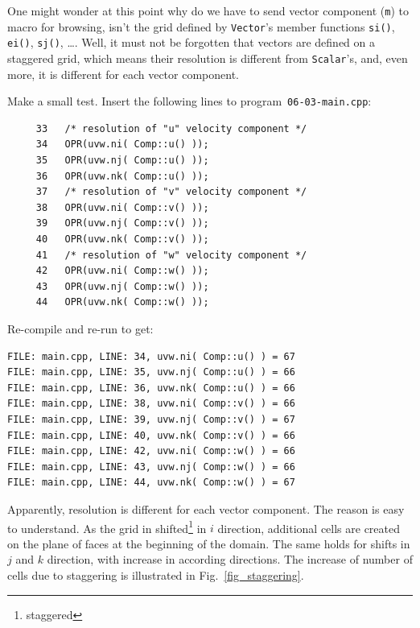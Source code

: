 One might wonder at this point why do we have to send vector component ({\tt m})
to macro for browsing, isn't the grid defined by {\tt Vector}'s member functions
{\tt si()}, {\tt ei()}, {\tt sj()}, \ldots. Well, it must not be forgotten that
vectors are defined on a staggered grid, which means their resolution is different
from {\tt Scalar}'s, and, even more, it is different for each vector component.

Make a small test. Insert the following lines to program~{\tt 06-03-main.cpp}:
%
{\small \begin{verbatim}
     33   /* resolution of "u" velocity component */
     34   OPR(uvw.ni( Comp::u() ));
     35   OPR(uvw.nj( Comp::u() ));
     36   OPR(uvw.nk( Comp::u() ));
     37   /* resolution of "v" velocity component */
     38   OPR(uvw.ni( Comp::v() ));
     39   OPR(uvw.nj( Comp::v() ));
     40   OPR(uvw.nk( Comp::v() ));
     41   /* resolution of "w" velocity component */
     42   OPR(uvw.ni( Comp::w() ));
     43   OPR(uvw.nj( Comp::w() ));
     44   OPR(uvw.nk( Comp::w() ));
\end{verbatim}}
%
Re-compile and re-run to get:
%
{\small \begin{verbatim}
FILE: main.cpp, LINE: 34, uvw.ni( Comp::u() ) = 67
FILE: main.cpp, LINE: 35, uvw.nj( Comp::u() ) = 66
FILE: main.cpp, LINE: 36, uvw.nk( Comp::u() ) = 66
FILE: main.cpp, LINE: 38, uvw.ni( Comp::v() ) = 66
FILE: main.cpp, LINE: 39, uvw.nj( Comp::v() ) = 67
FILE: main.cpp, LINE: 40, uvw.nk( Comp::v() ) = 66
FILE: main.cpp, LINE: 42, uvw.ni( Comp::w() ) = 66
FILE: main.cpp, LINE: 43, uvw.nj( Comp::w() ) = 66
FILE: main.cpp, LINE: 44, uvw.nk( Comp::w() ) = 67
\end{verbatim}}
%
Apparently, resolution is different for each vector component. The reason is
easy to understand. As the grid in shifted\footnote{staggered} in $i$ direction, 
additional cells are created on the plane of faces at the beginning of the domain. 
The same holds for shifts in $j$ and $k$ direction, with increase in according
directions.
The increase of number of cells due to staggering is illustrated 
in Fig.~\ref{fig_staggering}.
%
